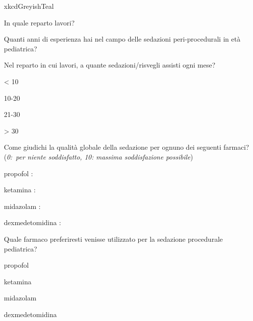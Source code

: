 \begin{survey}{xkcdGreyishTeal}


    
       \Query In quale reparto lavori? 
       
       \Query Quanti anni di esperienza hai nel campo delle sedazioni peri-procedurali in età pediatrica? 
       
       
       \Query Nel reparto in cui lavori, a quante sedazioni/risvegli assisti ogni mese?
       \begin{Qlist}
           \item < 10
           \item 10-20
           \item 21-30
           \item > 30
       \end{Qlist}
       

       \Query Come giudichi la qualità globale della sedazione per ognuno dei seguenti farmaci? (\emph{0:~per niente soddisfatto, 10: massima soddisfazione possibile})
       
       propofol : \hfill {} 
    
       ketamina : \hfill {}
    
        midazolam : \hfill {}
    
        dexmedetomidina : \hfill {}
    
       
       
         \Query Quale farmaco preferiresti venisse utilizzato per la sedazione procedurale pediatrica? 
       \begin{Qlist}
            \item propofol
            \item ketamina
            \item midazolam
            \item dexmedetomidina
       \end{Qlist}
       

\end{survey}
